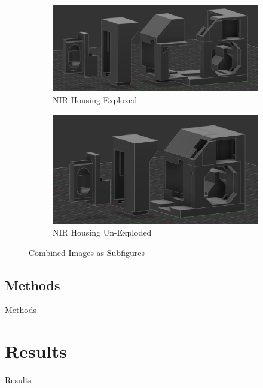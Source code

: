 \documentclass[final, 3p, 11pt]{elsarticle}
\begin{document}
\begin{figure}[ht]
        \centering
        \begin{subfigure}[b]{0.45\textwidth}
            \centering
            \includegraphics[width=\textwidth]{Images/nir_exploded.png}  %
            \caption{NIR Housing Exploxed}
            \label{fig:subfigure1}
        \end{subfigure}
        \hfill
        \begin{subfigure}[b]{0.45\textwidth}
            \centering
            \includegraphics[width=\textwidth]{Images/nir_housing.png}  %
            \caption{NIR Housing Un-Exploded}
            \label{fig:subfigure2}
        \end{subfigure}
        \caption{Combined Images as Subfigures}
        \label{fig:combinedfigures}
    \end{figure}


\subsection{Methods}
Methods

\section{Results}
Results
\end{document}
